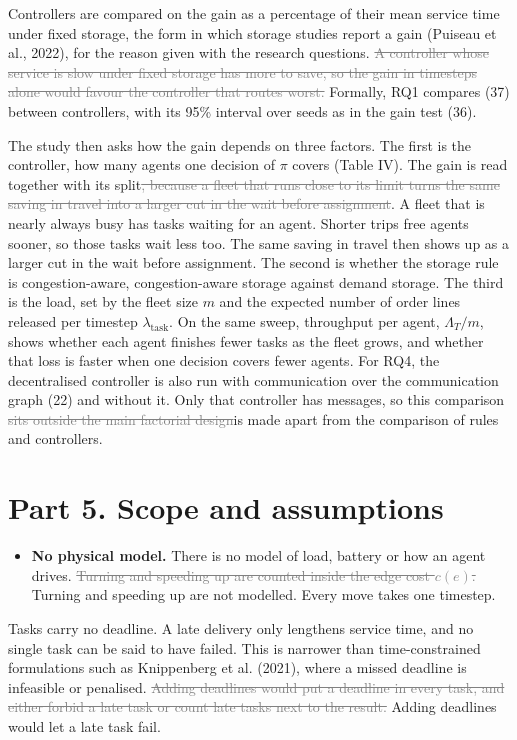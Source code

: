 \documentclass[11pt,a4paper]{article}
\newcommand{\new}[1]{\textcolor{newc}{#1}}
\newcommand{\old}[1]{\textcolor{gray}{\sout{#1}}}
\begin{document}
Controllers are compared on the gain as a percentage of their mean service
time under fixed storage, the form in which storage studies report a gain
(Puiseau et al., 2022)\new{, for the reason given with the research
questions}. \old{A controller whose service is slow under fixed storage has
more to save, so the gain in timesteps alone would favour the controller that
routes worst.} Formally, RQ1 compares (37) between controllers, with its 95\%
interval over seeds as in the gain test (36).

The study then asks how the gain depends on three factors. The first is the
controller, how many agents one decision of $\pi$ covers (Table IV). The gain
is read together with its split\old{, because a fleet that runs close to its
limit turns the same saving in travel into a larger cut in the wait before
assignment}. \new{A fleet that is nearly always busy has tasks waiting for an
agent. Shorter trips free agents sooner, so those tasks wait less too. The
same saving in travel then shows up as a larger cut in the wait before
assignment.} The second is whether the storage rule is congestion-aware,
congestion-aware storage against demand storage. The third is the load, set
by the fleet size $m$ and the expected number of order lines released per
timestep $\lambda_{\mathrm{task}}$. On the same sweep, throughput per agent,
$\Lambda_T/m$, shows whether each agent finishes fewer tasks as the fleet
grows, and whether that loss is faster when one decision covers fewer agents.
For RQ4, the decentralised controller is also run with communication over
the communication graph (22) and without it. Only that controller has
messages, so this comparison \old{sits outside the main factorial design}\new{is
made apart from the comparison of rules and controllers}.

\section*{Part 5. Scope and assumptions}

\begin{itemize}[nosep]
  \item \textbf{No physical model.} There is no model of load, battery or how
        an agent drives. \old{Turning and speeding up are counted inside the
        edge cost $c(e)$.} \new{Turning and speeding up are not modelled.
        Every move takes one timestep.}
\end{itemize}

Tasks carry no deadline. A late delivery only lengthens service time, and no
single task can be said to have failed. This is narrower than
time-constrained formulations such as Knippenberg et al. (2021), where a
missed deadline is infeasible or penalised. \old{Adding deadlines would put a
deadline in every task, and either forbid a late task or count late tasks
next to the result.} \new{Adding deadlines would let a late task fail.}
\end{document}

